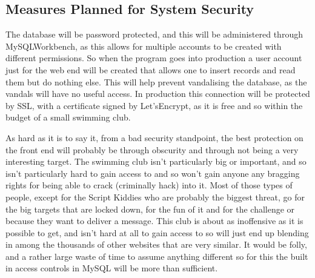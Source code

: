 \documentclass[
11pt, %
a4paper, %
oneside, %
headinclude,footinclude, %
BCOR5mm, %
]{scrartcl}
\begin{document}
\subsection{Measures Planned for System Security}
The database will be password protected, and this will be administered through MySQLWorkbench, as this allows for multiple accounts to be created with different permissions. So when the program goes into production a user account just for the web end will be created that allows one to insert records and read them but do nothing else. This will help prevent vandalising the database, as the vandals will have no useful access. In production this connection will be protected by SSL, with a certificate signed by Let'sEncrypt, as it is free and so within the budget of a small swimming club. \par As hard as it is to say it,  from a bad security standpoint, the best protection on the front end will probably be through obscurity and through not being a very interesting target. The swimming club isn't particularly big or important, and so isn't particularly hard to gain access to and so won't gain anyone any bragging rights for being able to crack (criminally hack) into it. Most of those types of people, except for the Script Kiddies who are probably the biggest threat, go for the big targets that are locked down, for the fun of it and for the challenge or because they want to deliver a message. This club is about as inoffensive as it is possible to get, and isn't hard at all to gain access to so will just end up blending in among the thousands of other websites that are very similar. It would be folly, and a rather large waste of time to assume anything different so for this the built in access controls in MySQL will be more than sufficient. 
\end{document}
